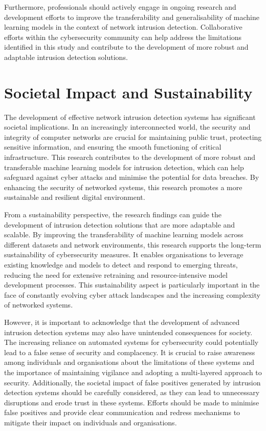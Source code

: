 Furthermore, professionals should actively engage in ongoing research and development efforts to improve the transferability and generalisability of machine learning models in the context of network intrusion detection. Collaborative efforts within the cybersecurity community can help address the limitations identified in this study and contribute to the development of more robust and adaptable intrusion detection solutions.

\section{Societal Impact and Sustainability}
The development of effective network intrusion detection systems has significant societal implications. In an increasingly interconnected world, the security and integrity of computer networks are crucial for maintaining public trust, protecting sensitive information, and ensuring the smooth functioning of critical infrastructure. This research contributes to the development of more robust and transferable machine learning models for intrusion detection, which can help safeguard against cyber attacks and minimise the potential for data breaches. By enhancing the security of networked systems, this research promotes a more sustainable and resilient digital environment.

From a sustainability perspective, the research findings can guide the development of intrusion detection solutions that are more adaptable and scalable. By improving the transferability of machine learning models across different datasets and network environments, this research supports the long-term sustainability of cybersecurity measures. It enables organisations to leverage existing knowledge and models to detect and respond to emerging threats, reducing the need for extensive retraining and resource-intensive model development processes. This sustainability aspect is particularly important in the face of constantly evolving cyber attack landscapes and the increasing complexity of networked systems.

However, it is important to acknowledge that the development of advanced intrusion detection systems may also have unintended consequences for society. The increasing reliance on automated systems for cybersecurity could potentially lead to a false sense of security and complacency. It is crucial to raise awareness among individuals and organisations about the limitations of these systems and the importance of maintaining vigilance and adopting a multi-layered approach to security. Additionally, the societal impact of false positives generated by intrusion detection systems should be carefully considered, as they can lead to unnecessary disruptions and erode trust in these systems. Efforts should be made to minimise false positives and provide clear communication and redress mechanisms to mitigate their impact on individuals and organisations.

